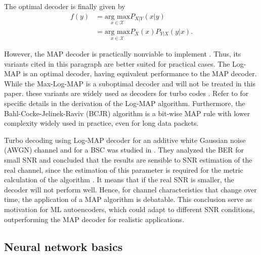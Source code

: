 \documentclass[conference]{IEEEtran}
\begin{document}
The optimal decoder is finally given by
\begin{align}
f(y) &= \underset{x\in \mathcal{X}}{\text{arg max}} P_{X|Y}(x|y)\label{eq:MAPF1}\\
&= \underset{x\in \mathcal{X}}{\text{arg max}}
P_X(x)P_{Y|X}(y|x).\label{eq:MAPF2}
\end{align}

However, the MAP decoder is practically nonviable to implement \cite{journals/ett/RobertsonHV97}. Thus, its variants cited in this paragraph are better suited for practical cases. The Log-MAP is an optimal decoder, having equivalent performance to the MAP decoder. While the Max-Log-MAP is a suboptimal decoder and will not be treated in this paper.  these variants are widely used as decoders for turbo codes \cite{b7}. Refer to \cite{journals/ett/RobertsonHV97} for specific details in the derivation of the Log-MAP algorithm. Furthermore, the Bahl-Cocke-Jelinek-Raviv (BCJR) algorithm is a bit-wise MAP rule with lower complexity widely used in practice, even for long data packets.

Turbo decoding using Log-MAP decoder for an additive white Gaussian noise (AWGN) channel and for a BSC was studied in \cite{b5}. They analyzed the BER for small SNR and concluded that the results are sensible to SNR estimation of the real channel, since the estimation of this parameter is required for the metric calculation of the algorithm \cite{journals/ett/RobertsonHV97}. It means that if the real SNR is smaller, the decoder will not perform well. Hence, for channel characteristics that change over time, the application of a MAP algorithm is debatable. This conclusion serve as motivation for ML autoencoders, which could adapt to different SNR conditions, outperforming the MAP decoder for realistic applications.

\subsection{Neural network basics}

\end{document}
